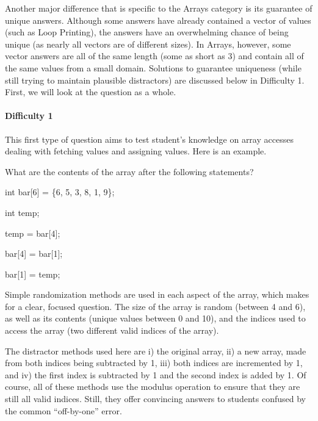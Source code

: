 \documentclass{article}
\begin{document}
Another major difference that is specific to the Arrays category is its guarantee of unique answers. Although some answers have already contained a vector of values (such as Loop Printing), 
the answers have an overwhelming chance of being unique (as nearly all vectors are of different sizes). In Arrays, however, some vector answers are all of the same length (some as short as 3) and contain all of the same values from a small domain. Solutions to guarantee uniqueness (while still trying to maintain plausible distractors) are discussed below in Difficulty 1. First, we will look
at the question as a whole.

\paragraph{Difficulty 1} \hfill \par

This first type of question aims to test student's knowledge on array accesses dealing with fetching values and assigning values. Here is an example.

\hfill \par
What are the contents of the array after the following statements? \par
int bar[6] = \{6, 5, 3, 8, 1, 9\}; \par
int temp; \par
temp = bar[4]; \par
bar[4] = bar[1]; \par
bar[1] = temp; \par
\hfill \par

Simple randomization methods are used in each aspect of the array, which makes for a clear, focused question. The size of the array is random (between 4 and 6), as well as its contents
(unique values between 0 and 10), and the indices used to access the array (two different valid indices of the array). 

The distractor methods used here are i) the original array, ii) a new array, made from both indices being subtracted by 1, iii) both indices are incremented by 1, and iv) the first index is
subtracted by 1 and the second index is added by 1. Of course, all of these methods use the modulus operation to ensure that they are still all valid indices. Still, they offer convincing 
answers to students confused by the common ``off-by-one'' error. 
\end{document}
